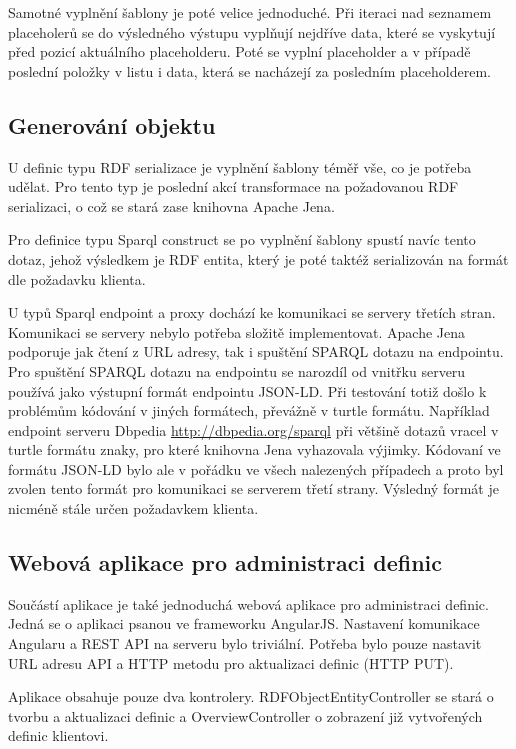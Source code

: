 \documentclass[thesis=B,czech]{FITthesis}[2012/06/26]
\begin{document}
  Samotné vyplnění šablony je poté velice jednoduché. Při iteraci nad seznamem placeholerů se do výsledného výstupu vyplňují nejdříve data, které se vyskytují před
  pozicí aktuálního placeholderu. Poté se vyplní placeholder a v případě poslední položky v listu i data, která se nacházejí za posledním placeholderem.
  
  \subsection{Generování objektu}
  U definic typu RDF serializace je vyplnění šablony téměř vše, co je potřeba udělat. Pro tento typ je poslední akcí transformace na požadovanou RDF serializaci,
  o což se stará zase knihovna Apache Jena.
  
  Pro definice typu Sparql construct se po vyplnění šablony spustí navíc tento dotaz, jehož výsledkem je RDF entita, který je poté taktéž serializován na formát dle
  požadavku klienta.
  
  U typů Sparql endpoint a proxy dochází ke komunikaci se servery třetích stran. Komunikaci se servery nebylo potřeba složitě implementovat.
  Apache Jena podporuje jak čtení z URL adresy, tak i spuštění SPARQL dotazu na endpointu. Pro spuštění SPARQL dotazu na endpointu se narozdíl od vnitřku serveru
  používá jako výstupní formát endpointu JSON-LD. Při testování totiž došlo k problémům kódování v jiných formátech, převážně v turtle formátu. Například endpoint
  serveru Dbpedia \url{http://dbpedia.org/sparql} při většině dotazů vracel v turtle formátu znaky, pro které knihovna Jena vyhazovala výjimky. Kódovaní ve formátu
  JSON-LD bylo ale v pořádku ve všech nalezených případech a proto byl zvolen tento formát pro komunikaci se serverem třetí strany. Výsledný formát je nicméně
  stále určen požadavkem klienta.
  
  \subsection{Webová aplikace pro administraci definic}
  Součástí aplikace je také jednoduchá webová aplikace pro administraci definic. Jedná se o aplikaci psanou ve frameworku AngularJS. 
  Nastavení komunikace Angularu a REST API na serveru bylo triviální. Potřeba bylo pouze nastavit URL adresu API a HTTP metodu pro aktualizaci
  definic (HTTP PUT). 
  
  Aplikace obsahuje pouze dva kontrolery. RDFObjectEntityController se stará o tvorbu a aktualizaci definic a OverviewController o zobrazení již vytvořených
  definic klientovi. 
  
\end{document}
